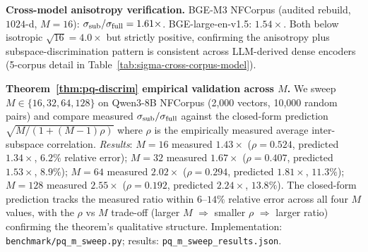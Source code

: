 \documentclass[review,1p]{elsarticle}
\begin{document}
\textbf{Cross-model anisotropy verification.} BGE-M3 NFCorpus (audited rebuild, $1024$-d, $M=16$): $\sigma_{\rm sub}/\sigma_{\rm full} = 1.61\times$. BGE-large-en-v1.5: $1.54\times$. Both below isotropic $\sqrt{16}=4.0\times$ but strictly positive, confirming the anisotropy plus subspace-discrimination pattern is consistent across LLM-derived dense encoders (5-corpus detail in Table~\ref{tab:sigma-cross-corpus-model}).

\textbf{Theorem~\ref{thm:pq-discrim} empirical validation across $M$.} We sweep $M \in \{16, 32, 64, 128\}$ on Qwen3-8B NFCorpus (2{,}000 vectors, 10{,}000 random pairs) and compare measured $\sigma_{\rm sub}/\sigma_{\rm full}$ against the closed-form prediction $\sqrt{M/(1+(M-1)\rho)}$ where $\rho$ is the empirically measured average inter-subspace correlation. \emph{Results}: $M{=}16$ measured $1.43\times$ ($\rho{=}0.524$, predicted $1.34\times$, $6.2\%$ relative error); $M{=}32$ measured $1.67\times$ ($\rho{=}0.407$, predicted $1.53\times$, $8.9\%$); $M{=}64$ measured $2.02\times$ ($\rho{=}0.294$, predicted $1.81\times$, $11.3\%$); $M{=}128$ measured $2.55\times$ ($\rho{=}0.192$, predicted $2.24\times$, $13.8\%$). The closed-form prediction tracks the measured ratio within $6$--$14\%$ relative error across all four $M$ values, with the $\rho$ vs $M$ trade-off (larger $M$ $\Rightarrow$ smaller $\rho$ $\Rightarrow$ larger ratio) confirming the theorem's qualitative structure. Implementation: \texttt{benchmark/pq\_m\_sweep.py}; results: \texttt{pq\_m\_sweep\_results.json}.
\end{document}
